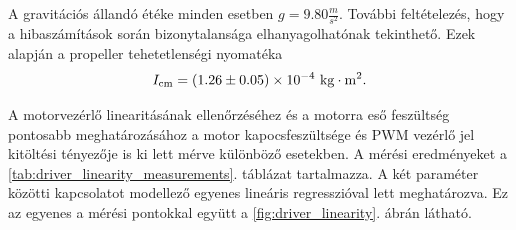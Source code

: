 A gravitációs állandó étéke minden esetben \(g = 9.80 \frac{m}{s^2}\). További feltételezés, hogy a 
hibaszámítások során bizonytalansága elhanyagolhatónak tekinthető. Ezek alapján a propeller 
tehetetlenségi nyomatéka
\begin{equation}
    I_{\mathrm{cm}} = (1.26 \pm 0.05)\times10^{-4}~\mathrm{kg \cdot m^2}.
\end{equation}

A motorvezérlő linearitásának ellenőrzéséhez és a motorra eső feszültség pontosabb meghatározásához 
a motor kapocsfeszültsége és PWM vezérlő jel kitöltési tényezője is ki lett mérve különböző esetekben.
A mérési eredményeket a \ref{tab:driver_linearity_measurements}. táblázat tartalmazza. A két paraméter közötti kapcsolatot modellező 
egyenes lineáris regresszióval lett meghatározva. Ez az egyenes a mérési pontokkal együtt a \ref{fig:driver_linearity}.
ábrán látható.


